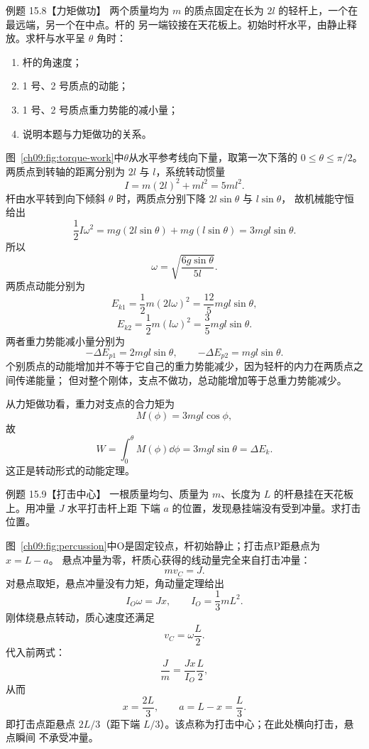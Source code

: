 \Needspace{0.39\textheight}
\begin{origexamplebox}{例题 15.8【力矩做功】}
两个质量均为 $m$ 的质点固定在长为 $2l$ 的轻杆上，一个在最远端，另一个在中点。杆的
另一端铰接在天花板上。初始时杆水平，由静止释放。求杆与水平呈 $\theta$ 角时：
\begin{enumerate}[label=(\arabic*),leftmargin=2.2em]
  \item 杆的角速度；
  \item 1 号、2 号质点的动能；
  \item 1 号、2 号质点重力势能的减小量；
  \item 说明本题与力矩做功的关系。
\end{enumerate}
\torqueWorkDiagram
\end{origexamplebox}

\begin{xesolution}
图~\ref{ch09:fig:torque-work}中$\theta$从水平参考线向下量，取第一次下落的 $0\le\theta\le\pi/2$。
两质点到转轴的距离分别为 $2l$ 与 $l$，系统转动惯量
\[
 I=m(2l)^2+ml^2=5ml^2.
\]
杆由水平转到向下倾斜 $\theta$ 时，两质点分别下降 $2l\sin\theta$ 与 $l\sin\theta$，
故机械能守恒给出
\[
 \frac12I\omega^2=mg(2l\sin\theta)+mg(l\sin\theta)=3mgl\sin\theta.
\]
所以
\[
 \boxed{\omega=\sqrt{\frac{6g\sin\theta}{5l}}}.
\]
两质点动能分别为
\[
 \boxed{E_{k1}=\frac12m(2l\omega)^2
 =\frac{12}{5}mgl\sin\theta},
\]
\[
 \boxed{E_{k2}=\frac12m(l\omega)^2
 =\frac35mgl\sin\theta}.
\]
两者重力势能减小量分别为
\[
 \boxed{-\Delta E_{p1}=2mgl\sin\theta},
 \qquad
 \boxed{-\Delta E_{p2}=mgl\sin\theta}.
\]
个别质点的动能增加并不等于它自己的重力势能减少，因为轻杆的内力在两质点之间传递能量；
但对整个刚体，支点不做功，总动能增加等于总重力势能减少。

从力矩做功看，重力对支点的合力矩为
\[
 M(\phi)=3mgl\cos\phi,
\]
故
\[
 W=\int_0^\theta M(\phi)\dd\phi
 =3mgl\sin\theta=\Delta E_k.
\]
这正是转动形式的动能定理。
\end{xesolution}

\Needspace{0.37\textheight}
\begin{origexamplebox}{例题 15.9【打击中心】}
一根质量均匀、质量为 $m$、长度为 $L$ 的杆悬挂在天花板上。用冲量 $J$ 水平打击杆上距
下端 $a$ 的位置，发现悬挂端没有受到冲量。求打击位置。
\percussionDiagram
\end{origexamplebox}

\begin{xesolution}
图~\ref{ch09:fig:percussion}中O是固定铰点，杆初始静止；打击点P距悬点为 $x=L-a$。
悬点冲量为零，杆质心获得的线动量完全来自打击冲量：
\[
 mv_C=J.
\]
对悬点取矩，悬点冲量没有力矩，角动量定理给出
\[
 I_O\omega=Jx,
 \qquad I_O=\frac13mL^2.
\]
刚体绕悬点转动，质心速度还满足
\[
 v_C=\omega\frac L2.
\]
代入前两式：
\[
 \frac Jm=\frac{Jx}{I_O}\frac L2,
\]
从而
\[
 \boxed{x=\frac{2L}{3}},
 \qquad
 \boxed{a=L-x=\frac L3}.
\]
即打击点距悬点 $2L/3$（距下端 $L/3$）。该点称为打击中心；在此处横向打击，悬点瞬间
不承受冲量。
\end{xesolution}

